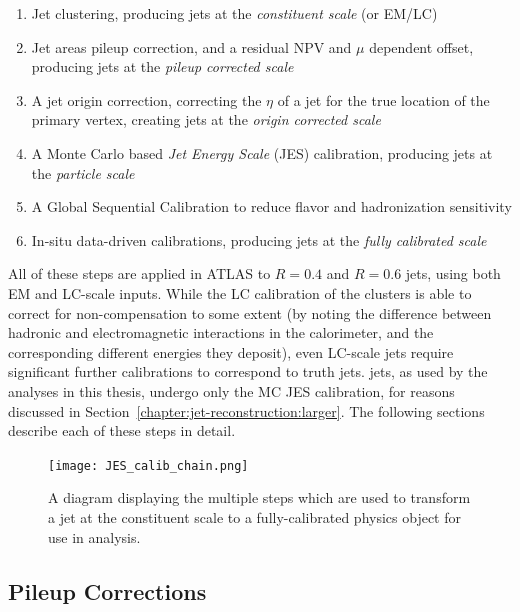 \begin{enumerate}
	\item Jet clustering, producing jets at the \textit{constituent scale} (or EM/LC)
	\item Jet areas pileup correction, and a residual NPV and $\mu$ dependent offset, producing jets at the \textit{pileup corrected scale}
	\item A jet origin correction, correcting the $\eta$ of a jet for the true location of the primary vertex, creating jets at the \textit{origin corrected scale}
	\item A Monte Carlo based \textit{Jet Energy Scale} (JES) calibration, producing jets at the \textit{particle scale}
	\item A Global Sequential Calibration to reduce flavor and hadronization sensitivity
	\item In-situ data-driven calibrations, producing jets at the \textit{fully calibrated scale}
\end{enumerate}

All of these steps are applied in ATLAS to $R=0.4$ and $R=0.6$ jets, using both EM and LC-scale inputs. While the LC calibration of the clusters is able to correct for non-compensation to some extent (by noting the difference between hadronic and electromagnetic interactions in the calorimeter, and the corresponding different energies they deposit), even LC-scale jets require significant further calibrations to correspond to truth jets. \LargeR jets, as used by the analyses in this thesis, undergo only the MC JES calibration, for reasons discussed in Section~\ref{chapter:jet-reconstruction:larger}. The following sections describe each of these steps in detail.


\begin{figure}
\centering
\texttt{[image: JES\_calib\_chain.png]}
\caption{A diagram displaying the multiple steps which are used to transform a jet at the constituent scale to a fully-calibrated physics object for use in analysis.}
\label{fig:jet-reconstruction:making-jets}
\end{figure}


\subsection{Pileup Corrections}
\label{chapter:jet-reconstruction:pileup-corrections}

